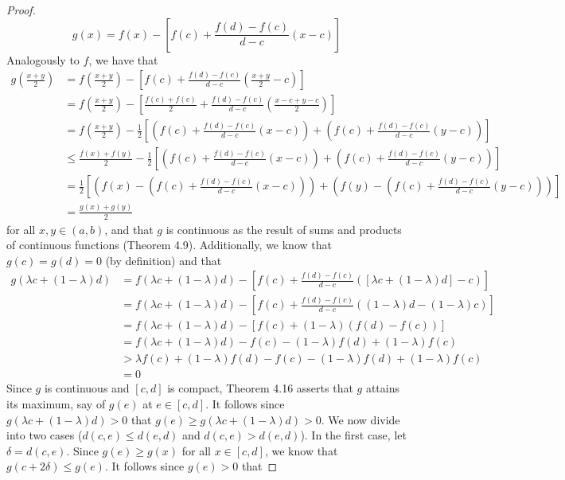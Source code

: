 \documentclass[../psets.tex]{subfiles}
\begin{document}
\begin{enumerate}[label={\textbf{\arabic*.}}]
\begin{proof}
\begin{equation*}
            g(x) = f(x)-\left[ f(c)+\frac{f(d)-f(c)}{d-c}(x-c) \right]
        \end{equation*}
        Analogously to $f$, we have that
        \begin{align*}
            g\left( \frac{x+y}{2} \right) &= f\left( \frac{x+y}{2} \right)-\left[ f(c)+\frac{f(d)-f(c)}{d-c}\left( \frac{x+y}{2}-c \right) \right]\\
            &= f\left( \frac{x+y}{2} \right)-\left[ \frac{f(c)+f(c)}{2}+\frac{f(d)-f(c)}{d-c}\left( \frac{x-c+y-c}{2} \right) \right]\\
            &= f\left( \frac{x+y}{2} \right)-\frac{1}{2}\left[ \left( f(c)+\frac{f(d)-f(c)}{d-c}(x-c) \right)+\left( f(c)+\frac{f(d)-f(c)}{d-c}(y-c) \right) \right]\\
            &\leq \frac{f(x)+f(y)}{2}-\frac{1}{2}\left[ \left( f(c)+\frac{f(d)-f(c)}{d-c}(x-c) \right)+\left( f(c)+\frac{f(d)-f(c)}{d-c}(y-c) \right) \right]\\
            &= \frac{1}{2}\left[ \left( f(x)-\left( f(c)+\frac{f(d)-f(c)}{d-c}(x-c) \right) \right)+\left( f(y)-\left( f(c)+\frac{f(d)-f(c)}{d-c}(y-c) \right) \right) \right]\\
            &= \frac{g(x)+g(y)}{2}
        \end{align*}
        for all $x,y\in(a,b)$, and that $g$ is continuous as the result of sums and products of continuous functions (Theorem 4.9). Additionally, we know that $g(c)=g(d)=0$ (by definition) and that
        \begin{align*}
            g(\lambda c+(1-\lambda)d) &= f(\lambda c+(1-\lambda)d)-\left[ f(c)+\frac{f(d)-f(c)}{d-c}([\lambda c+(1-\lambda)d]-c) \right]\\
            &= f(\lambda c+(1-\lambda)d)-\left[ f(c)+\frac{f(d)-f(c)}{d-c}((1-\lambda)d-(1-\lambda)c) \right]\\
            &= f(\lambda c+(1-\lambda)d)-[f(c)+(1-\lambda)(f(d)-f(c))]\\
            &= f(\lambda c+(1-\lambda)d)-f(c)-(1-\lambda)f(d)+(1-\lambda)f(c)\\
            &> \lambda f(c)+(1-\lambda)f(d)-f(c)-(1-\lambda)f(d)+(1-\lambda)f(c)\\
            &= 0
        \end{align*}
        Since $g$ is continuous and $[c,d]$ is compact, Theorem 4.16 asserts that $g$ attains its maximum, say of $g(e)$ at $e\in[c,d]$. It follows since $g(\lambda c+(1-\lambda)d)>0$ that $g(e)\geq g(\lambda c+(1-\lambda)d)>0$. We now divide into two cases ($d(c,e)\leq d(e,d)$ and $d(c,e)>d(e,d)$). In the first case, let $\delta=d(c,e)$. Since $g(e)\geq g(x)$ for all $x\in[c,d]$, we know that $g(c+2\delta)\leq g(e)$. It follows since $g(e)>0$ that

\end{proof}
\end{enumerate}
\end{document}
